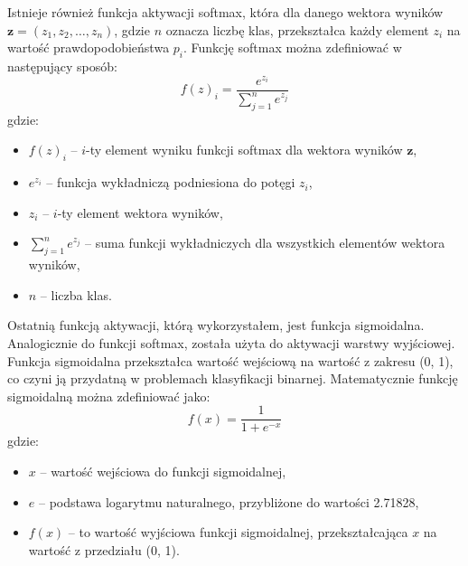 \documentclass{article}
\begin{document}
Istnieje również funkcja aktywacji softmax, która dla danego wektora wyników \( \mathbf{z} = (z_1, z_2, \ldots, z_n) \), gdzie \( n \) oznacza liczbę klas, przekształca każdy element \( z_i \) na wartość prawdopodobieństwa \( p_i \).
Funkcję softmax można zdefiniować w następujący sposób:
\[
    f(z)_i = \frac{e^{z_i}}{\sum_{j=1}^{n} e^{z_j}}
\]
gdzie:
\begin{itemize}
    \item \(f(z)_i\) -- \(i\)-ty element wyniku funkcji softmax dla wektora wyników \(\mathbf{z}\),
    \item \(e^{z_i}\) -- funkcja wykładniczą podniesiona do potęgi \(z_i\),
    \item \(z_i\) -- \(i\)-ty element wektora wyników,
    \item \(\sum_{j=1}^{n} e^{z_j}\) -- suma funkcji wykładniczych dla wszystkich elementów wektora wyników,
    \item \(n\) -- liczba klas.
\end{itemize}
Ostatnią funkcją aktywacji, którą wykorzystałem, jest funkcja sigmoidalna.
Analogicznie do funkcji softmax, została użyta do aktywacji warstwy wyjściowej.
Funkcja sigmoidalna przekształca wartość wejściową na wartość z zakresu (0, 1), co czyni ją przydatną w problemach klasyfikacji binarnej.
Matematycznie funkcję sigmoidalną można zdefiniować jako:
\[
    f(x) = \frac{1}{1 + e^{-x}}
\]
gdzie:
\begin{itemize}
    \item \(x\) -- wartość wejściowa do funkcji sigmoidalnej,
    \item \(e\) --  podstawa logarytmu naturalnego, przybliżone do wartości 2.71828,
    \item \(f(x)\) -- to wartość wyjściowa funkcji sigmoidalnej, przekształcająca \(x\) na wartość z przedziału (0, 1).
\end{itemize}
\end{document}
